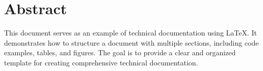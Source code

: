 \section*{Abstract}
This document serves as an example of technical documentation using LaTeX. It demonstrates how to structure a document with multiple sections, including code examples, tables, and figures. The goal is to provide a clear and organized template for creating comprehensive technical documentation.